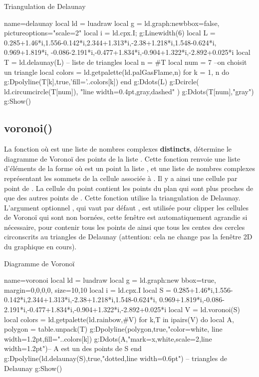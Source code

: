 \begin{demo}{Triangulation de Delaunay}
\begin{luadraw}{name=delaunay}
local ld = luadraw
local g = ld.graph:new{bbox=false, pictureoptions="scale=2"}
local i = ld.cpx.I; g:Linewidth(6)
local L = {0.285+1.46*i,1.556-0.142*i,2.344+1.313*i,-2.38+1.218*i,1.548-0.624*i,
0.969+1.819*i, -0.086-2.191*i,-0.477+1.834*i,-0.904+1.322*i,-2.892+0.025*i}
local T = ld.delaunay(L) -- liste de triangles
local n = #T
local num = 7 --on choisit un triangle
local colors = ld.getpalette(ld.palGasFlame,n)
for k = 1, n do
    g:Dpolyline(T[k],true,'fill='..colors[k])
    end
g:Ddots(L)
g:Dcircle( {ld.circumcircle(T[num])}, "line width=0.4pt,gray,dashed" )
g:Ddots(T[num],"gray")
g:Show()
\end{luadraw}
\end{demo}

\subsection{voronoi()}

La fonction  où  est une liste de nombres complexes \textbf{distincts}, détermine le diagramme de Voronoï des points de la liste . Cette fonction renvoie une liste d'éléments de la forme   où  est un point la liste , et  une liste de nombres complexes représentant les sommets de la cellule associée à . Il y a ainsi une cellule par point de . La cellule du point  contient les points du plan qui sont plus proches de  que des autres points de . Cette fonction utilise la triangulation de Delaunay. L'argument optionnel , qui vaut par défaut , est utilisée pour clipper les cellules de Voronoï qui sont non bornées, cette fenêtre est automatiquement agrandie si nécessaire, pour contenir tous les points de  ainsi que tous les centes des cercles circonscrits au triangles de Delaunay (attention: cela ne change pas la fenêtre 2D du graphique en cours).

\begin{demo}{Diagramme de Voronoï}
\begin{luadraw}{name=voronoi}
local ld = luadraw
local g = ld.graph:new{ bbox=true, margin={0,0,0,0}, size={10,10}}
local i = ld.cpx.I
local S = {0.285+1.46*i,1.556-0.142*i,2.344+1.313*i,-2.38+1.218*i,1.548-0.624*i,
0.969+1.819*i,-0.086-2.191*i,-0.477+1.834*i,-0.904+1.322*i,-2.892+0.025*i}
local V = ld.voronoi(S)
local colors = ld.getpalette(ld.rainbow,#V)
for k,T in ipairs(V) do
    local A, polygon = table.unpack(T)
    g:Dpolyline(polygon,true,"color=white, line width=1.2pt,fill="..colors[k])
    g:Ddots(A,"mark=x,white,scale=2,line width=1.2pt")-- A est un des points de S
end
g:Dpolyline(ld.delaunay(S),true,"dotted,line width=0.6pt") -- triangles de Delaunay
g:Show()
\end{luadraw}
\end{demo}

